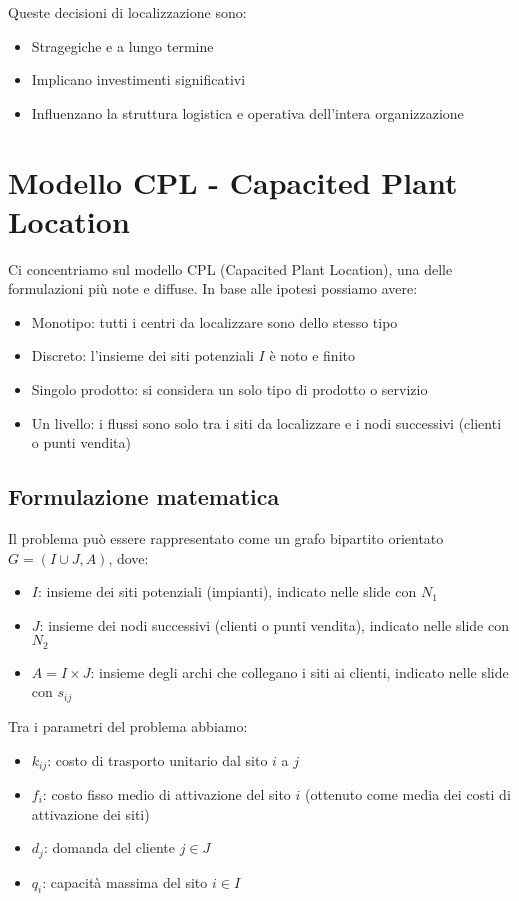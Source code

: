 Queste decisioni di localizzazione sono:
\begin{itemize}
    \item Stragegiche e a lungo termine
    \item Implicano investimenti significativi
    \item Influenzano la struttura logistica e operativa dell'intera organizzazione
\end{itemize}

\section{Modello CPL - Capacited Plant Location}
Ci concentriamo sul modello CPL (Capacited Plant Location), una delle 
formulazioni più note e diffuse. In base alle ipotesi possiamo avere:
\begin{itemize}
    \item Monotipo: tutti i centri da localizzare sono dello stesso tipo
    \item Discreto: l'insieme dei siti potenziali $I$ è noto e finito
    \item Singolo prodotto: si considera un solo tipo di prodotto o servizio
    \item Un livello: i flussi sono solo tra i siti da localizzare e i nodi successivi (clienti o punti vendita)
\end{itemize}

\subsection{Formulazione matematica}
Il problema può essere rappresentato come un grafo bipartito orientato 
$G = (I \cup J, A)$, dove:
\begin{itemize}
    \item $I$: insieme dei siti potenziali (impianti), indicato nelle slide con $N_1$
    \item $J$: insieme dei nodi successivi (clienti o punti vendita), indicato nelle slide con $N_2$
    \item $A = I \times J$: insieme degli archi che collegano i siti ai clienti, indicato nelle slide con $s_{ij}$
\end{itemize}

Tra i parametri del problema abbiamo:
\begin{itemize}
    \item $k_{ij}$: costo di trasporto unitario dal sito $i$ a $j$
    \item $f_i$: costo fisso medio di attivazione del sito $i$ (ottenuto come media dei costi di attivazione dei siti)
    \item $d_j$: domanda del cliente $j \in J$
    \item $q_i$: capacità massima del sito $i \in I$
\end{itemize}

